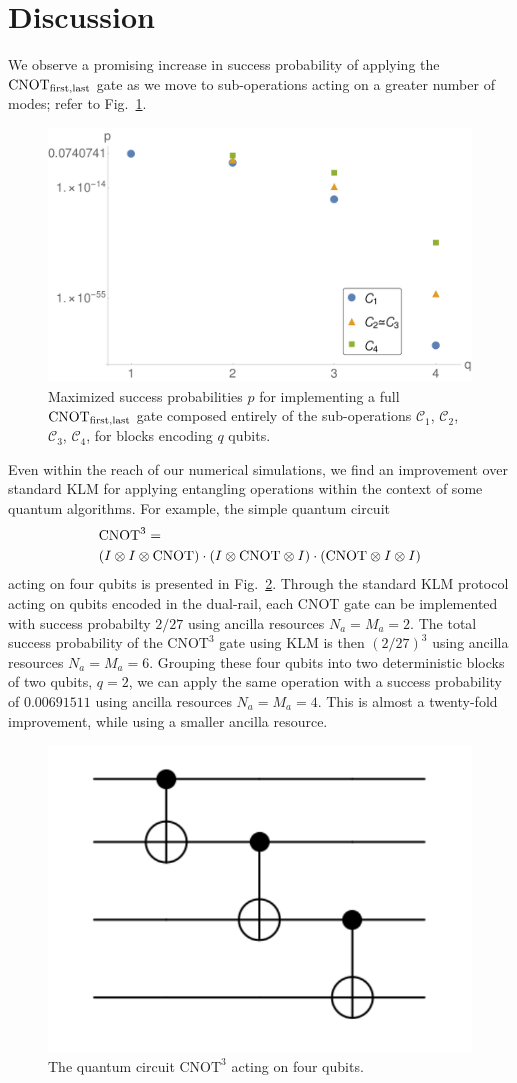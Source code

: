 \documentclass[aps,pra,twocolumn,showpacs,superscriptaddress,floatfix,10pt]{revtex4}
\begin{document}
 \section{Discussion}
 \label{Section Conclusion}
 We observe a promising increase in success probability of applying the $\mbox{CNOT}_{\rm first,last}$ gate as we move to sub-operations acting on a greater number of modes; refer to Fig.~\ref{Figure - Block Encoding Results}. 
 \begin{figure}[h]
  	\centering
  	\includegraphics[width=0.5 \textwidth]{./blockencodingresults.pdf}
  	\caption{Maximized success probabilities $p$ for implementing a full $\mbox{CNOT}_{\rm first,last}$ gate composed entirely of the sub-operations $\mathcal{C}_1$, $\mathcal{C}_2$, $\mathcal{C}_3$, $\mathcal{C}_4$, for blocks encoding $q$ qubits.}
  	\label{Figure - Block Encoding Results}
  \end{figure}
Even within the reach of our numerical simulations, we find an improvement over standard KLM for applying entangling operations within the context of some quantum algorithms. For example, the simple quantum circuit 
 \begin{eqnarray}
 \small & \mbox{CNOT}^3 = \\ \small \nonumber & (I \otimes I \otimes \mbox{CNOT}) \cdot (I \otimes  \mbox{CNOT} \otimes I) \cdot (\mbox{CNOT} \otimes I \otimes I)
 \end{eqnarray}
 acting on four qubits is presented in Fig.~\ref{Three CNOTs}. Through the standard KLM protocol acting on qubits encoded in the dual-rail, each CNOT gate can be implemented with success probabilty $2/27$ using ancilla resources $N_a=M_a=2$. The total success probability of the $\mbox{CNOT}^3$ gate using KLM is then $(2/27)^3$ using ancilla resources $ N_a=M_a = 6 $. Grouping these four qubits into two deterministic blocks of two qubits, $q=2$, we can apply the same operation with a success probability of $0.00691511$ using ancilla resources $ N_a=M_a=4 $. This is almost a twenty-fold improvement, while using a smaller ancilla resource.
 \begin{figure}[ht]
 	\centering
 	\includegraphics[width=0.25 \textwidth]{./ThreeCNOTs.pdf}
 	\caption{The quantum circuit $\mbox{CNOT}^3$ acting on four qubits.}
 	\label{Three CNOTs}
 \end{figure}
\end{document}

